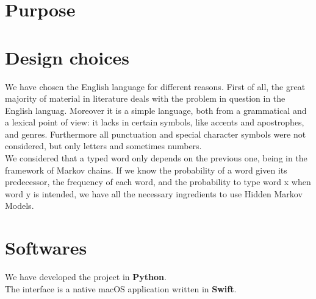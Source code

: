 \section{Purpose}

\section{Design choices}

We have chosen the English language for different reasons. First of all, the great majority of material in literature deals 
with the problem in question in the English languag. Moreover it is a simple language, both from a grammatical and a 
lexical point of view: it lacks in certain symbols, like accents and apostrophes, and genres. 
Furthermore all punctuation and special character symbols were not considered, but only letters and sometimes numbers. 
\\

We considered that a typed word only depends on the previous one, being 
in the framework of Markov chains. If we know the probability of a word 
given its predecessor, the frequency of each word, and the probability to 
type word x when word y is intended, we have all the necessary ingredients 
to use Hidden Markov Models.

\section{Softwares}
We have developed the project in \textbf{Python}.\\
The interface is a native macOS application written in \textbf{Swift}.
